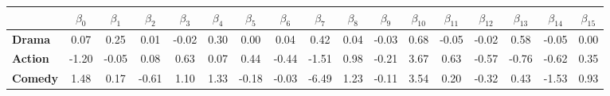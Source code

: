 \begin{tabular}{|l|c|c|c|c|c|c|c|c|c|c|c|c|c|c|c|c|}
\hline
&\textbf{$\beta_{0}$}&\textbf{$\beta_{1}$}&\textbf{$\beta_{2}$}&\textbf{$\beta_{3}$}&\textbf{$\beta_{4}$}&\textbf{$\beta_{5}$}&\textbf{$\beta_{6}$}&\textbf{$\beta_{7}$}&\textbf{$\beta_{8}$}&\textbf{$\beta_{9}$}&\textbf{$\beta_{10}$}&\textbf{$\beta_{11}$}&\textbf{$\beta_{12}$}&\textbf{$\beta_{13}$}&\textbf{$\beta_{14}$}&\textbf{$\beta_{15}$}\\\hline
\textbf{Drama}&0.07&0.25&0.01&-0.02&0.30&0.00&0.04&0.42&0.04&-0.03&0.68&-0.05&-0.02&0.58&-0.05&0.00\\\hline
\textbf{Action}&-1.20&-0.05&0.08&0.63&0.07&0.44&-0.44&-1.51&0.98&-0.21&3.67&0.63&-0.57&-0.76&-0.62&0.35\\\hline
\textbf{Comedy}&1.48&0.17&-0.61&1.10&1.33&-0.18&-0.03&-6.49&1.23&-0.11&3.54&0.20&-0.32&0.43&-1.53&0.93\\\hline
\end{tabular}
